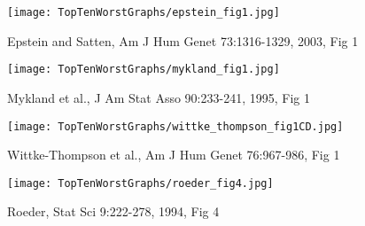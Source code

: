 \documentclass[12pt]{article}
\newcommand{\headsize}{\fontsize{35}{35} \selectfont}
\newcommand{\smallestsize}{\fontsize{18}{22} \selectfont}
\begin{document}
\vspace{30mm}

\centerline{\texttt{[image: TopTenWorstGraphs/epstein\_fig1.jpg]}}


\vfill \hfill \smallestsize \color{myblue}
Epstein and Satten, Am J Hum Genet 73:1316-1329, 2003, Fig 1

\newpage


\headsize \color{myyellow}
\hfill \begin{minipage}{5.75in}
\end{minipage}

\vspace{30mm}

\centerline{\texttt{[image: TopTenWorstGraphs/mykland\_fig1.jpg]}}

\vfill \hfill \smallestsize \color{myblue}
Mykland et al., J Am Stat Asso 90:233-241, 1995, Fig 1

\newpage


\headsize \color{myyellow}
\hfill \begin{minipage}{5.75in}
\end{minipage}

\vspace{30mm}

\centerline{\texttt{[image: TopTenWorstGraphs/wittke\_thompson\_fig1CD.jpg]}}

\vfill \hfill \smallestsize \color{myblue}
Wittke-Thompson et al., Am J Hum Genet 76:967-986, Fig 1

\newpage


\headsize \color{myyellow}
\hfill \begin{minipage}{5.75in}
\end{minipage}

\vspace{30mm}

\centerline{\texttt{[image: TopTenWorstGraphs/roeder\_fig4.jpg]}}


\vfill \hfill \smallestsize \color{myblue}
Roeder, Stat Sci 9:222-278, 1994, Fig 4
\end{document}
